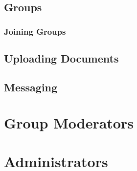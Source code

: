\documentclass[10pt]{article}
\begin{document}
\subsection{Groups}
\begin{flushleft}

\end{flushleft}

\subsubsection{Joining Groups}
\subsection{Uploading Documents}
\subsection{Messaging}

\section{Group Moderators}
\section{Administrators}




\end{document}
